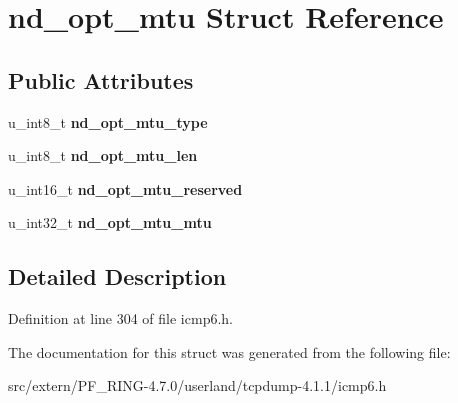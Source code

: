 \hypertarget{structnd__opt__mtu}{
\section{nd\_\-opt\_\-mtu Struct Reference}
\label{structnd__opt__mtu}
}
\subsection*{Public Attributes}
\begin{DoxyCompactItemize}
\item 
\hypertarget{structnd__opt__mtu_a4f645607380735fddcf74fae49293ee2}{
u\_\-int8\_\-t {\bfseries nd\_\-opt\_\-mtu\_\-type}}
\label{structnd__opt__mtu_a4f645607380735fddcf74fae49293ee2}

\item 
\hypertarget{structnd__opt__mtu_a138696a767f4a6628f04fdfc22e15032}{
u\_\-int8\_\-t {\bfseries nd\_\-opt\_\-mtu\_\-len}}
\label{structnd__opt__mtu_a138696a767f4a6628f04fdfc22e15032}

\item 
\hypertarget{structnd__opt__mtu_afa4fd78e008e2a9c71342dc820448e3d}{
u\_\-int16\_\-t {\bfseries nd\_\-opt\_\-mtu\_\-reserved}}
\label{structnd__opt__mtu_afa4fd78e008e2a9c71342dc820448e3d}

\item 
\hypertarget{structnd__opt__mtu_a77c76ae92d27ad5ec37c34dbc607213c}{
u\_\-int32\_\-t {\bfseries nd\_\-opt\_\-mtu\_\-mtu}}
\label{structnd__opt__mtu_a77c76ae92d27ad5ec37c34dbc607213c}

\end{DoxyCompactItemize}


\subsection{Detailed Description}


Definition at line 304 of file icmp6.h.



The documentation for this struct was generated from the following file:\begin{DoxyCompactItemize}
\item 
src/extern/PF\_\-RING-\/4.7.0/userland/tcpdump-\/4.1.1/icmp6.h\end{DoxyCompactItemize}
